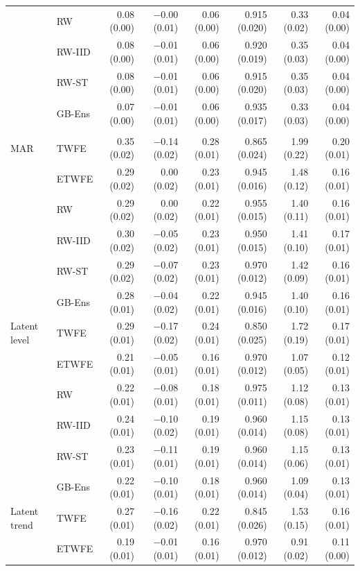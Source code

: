 \begin{table}
\begin{tabular*}{1\linewidth}{@{\extracolsep{\fill}}llrrrrrr}
 & RW & 0.08 (0.00) & −0.00 (0.01) & 0.06 (0.00) & 0.915 (0.020) & 0.33 (0.02) & 0.04 (0.00) \\ 
 & RW-IID & 0.08 (0.00) & −0.01 (0.01) & 0.06 (0.00) & 0.920 (0.019) & 0.35 (0.03) & 0.04 (0.00) \\ 
 & RW-ST & 0.08 (0.00) & −0.01 (0.01) & 0.06 (0.00) & 0.915 (0.020) & 0.35 (0.03) & 0.04 (0.00) \\ 
 & GB-Ens & 0.07 (0.00) & −0.01 (0.01) & 0.06 (0.00) & 0.935 (0.017) & 0.33 (0.03) & 0.04 (0.00) \\ 
\midrule\addlinespace[2.5pt]
\multicolumn{8}{l}{With covariates, event year 4} \\[2.5pt] 
\midrule\addlinespace[2.5pt]
MAR & TWFE & 0.35 (0.02) & −0.14 (0.02) & 0.28 (0.01) & 0.865 (0.024) & 1.99 (0.22) & 0.20 (0.01) \\ 
 & ETWFE & 0.29 (0.02) & 0.00 (0.02) & 0.23 (0.01) & 0.945 (0.016) & 1.48 (0.12) & 0.16 (0.01) \\ 
 & RW & 0.29 (0.02) & 0.00 (0.02) & 0.22 (0.01) & 0.955 (0.015) & 1.40 (0.11) & 0.16 (0.01) \\ 
 & RW-IID & 0.30 (0.02) & −0.05 (0.02) & 0.23 (0.01) & 0.950 (0.015) & 1.41 (0.10) & 0.17 (0.01) \\ 
 & RW-ST & 0.29 (0.02) & −0.07 (0.02) & 0.23 (0.01) & 0.970 (0.012) & 1.42 (0.09) & 0.16 (0.01) \\ 
 & GB-Ens & 0.28 (0.01) & −0.04 (0.02) & 0.22 (0.01) & 0.945 (0.016) & 1.40 (0.10) & 0.16 (0.01) \\ 
Latent level & TWFE & 0.29 (0.01) & −0.17 (0.02) & 0.24 (0.01) & 0.850 (0.025) & 1.72 (0.19) & 0.17 (0.01) \\ 
 & ETWFE & 0.21 (0.01) & −0.05 (0.01) & 0.16 (0.01) & 0.970 (0.012) & 1.07 (0.05) & 0.12 (0.01) \\ 
 & RW & 0.22 (0.01) & −0.08 (0.01) & 0.18 (0.01) & 0.975 (0.011) & 1.12 (0.08) & 0.13 (0.01) \\ 
 & RW-IID & 0.24 (0.01) & −0.10 (0.02) & 0.19 (0.01) & 0.960 (0.014) & 1.15 (0.08) & 0.13 (0.01) \\ 
 & RW-ST & 0.23 (0.01) & −0.11 (0.01) & 0.19 (0.01) & 0.960 (0.014) & 1.15 (0.06) & 0.13 (0.01) \\ 
 & GB-Ens & 0.22 (0.01) & −0.10 (0.01) & 0.18 (0.01) & 0.960 (0.014) & 1.09 (0.04) & 0.13 (0.01) \\ 
Latent trend & TWFE & 0.27 (0.01) & −0.16 (0.02) & 0.22 (0.01) & 0.845 (0.026) & 1.53 (0.15) & 0.16 (0.01) \\ 
 & ETWFE & 0.19 (0.01) & −0.01 (0.01) & 0.16 (0.01) & 0.970 (0.012) & 0.91 (0.02) & 0.11 (0.00) \\ 

\end{tabular*}
\end{table}

